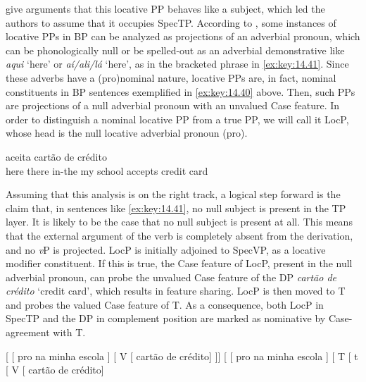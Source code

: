 \documentclass[output=paper]{langsci/langscibook}
\begin{document}
\citet{AvelarCyrino2008} give arguments that this locative PP behaves like a
subject, which led the authors to assume that it occupies SpecTP. According to
\citet{Avelar2006}, some instances of locative PPs in \gls{BP} can be analyzed
as projections of an adverbial pronoun, which can be phonologically null or be
spelled-out as an adverbial demonstrative like \emph{aqui} ‘here’ or
\emph{aí/ali/lá} ‘here’, as in the bracketed phrase in \eqref{ex:key:14.41}. Since
these adverbs have a (pro)nominal nature, locative PPs are, in fact, nominal
constituents in \gls{BP} sentences exemplified in \eqref{ex:key:14.40} above.
Then, such PPs are projections of a null adverbial pronoun with an unvalued
Case feature. In order to distinguish a nominal locative PP from a true PP, we
will call it LocP, whose head is the null locative adverbial pronoun
(pro\tss{\Loc}).

\ea\label{ex:key:14.41}
     aceita {cartão de crédito}\\
            {} \hphantom{(}here {} there in-the my school {} accepts {credit card}\\
\z

Assuming that this analysis is on the right track, a logical step forward is
the claim that, in sentences like \eqref{ex:key:14.41}, no null subject is present
in the TP layer. It is likely to be the case that no null subject is present at
all. This means that the external argument of the verb is completely absent
from the derivation, and no \emph{v}P is projected. LocP is initially adjoined
to SpecVP, as a locative modifier constituent. If this is true, the Case
feature of LocP, present in the null adverbial pronoun, can probe the unvalued
Case feature of the DP \emph{cartão de crédito} ‘credit card’, which
results in feature sharing. LocP is then moved to T and probes the valued Case
feature of T. As a consequence, both LocP in SpecTP and the DP in complement
position are marked as nominative by Case-agreement with T.

\ea\label{ex:key:14.42}
    \ea {}[ [ pro\tss{\Loc} na minha escola ]
            [ V [ cartão de crédito] ]]
    \ex {}[ [ pro\tss{\Loc} na minha escola ]
            [ T [ t [ V
                [ cartão de crédito]
    \z
\z
\end{document}
